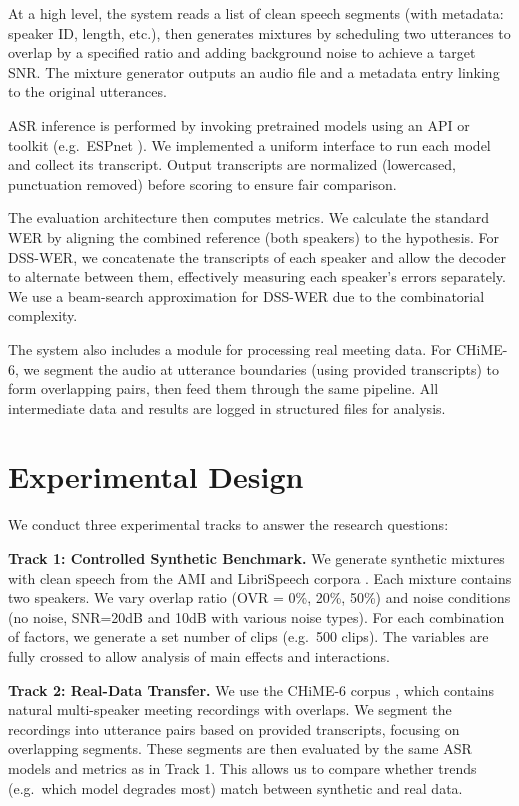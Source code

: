\documentclass[11pt,a4paper]{report}
\begin{document}
At a high level, the system reads a list of clean speech segments (with metadata: speaker ID, length, etc.), then generates mixtures by scheduling two utterances to overlap by a specified ratio and adding background noise to achieve a target SNR. The mixture generator outputs an audio file and a metadata entry linking to the original utterances.

ASR inference is performed by invoking pretrained models using an API or toolkit (e.g.\ ESPnet \cite{ESPnet}). We implemented a uniform interface to run each model and collect its transcript. Output transcripts are normalized (lowercased, punctuation removed) before scoring to ensure fair comparison.

The evaluation architecture then computes metrics. We calculate the standard WER by aligning the combined reference (both speakers) to the hypothesis. For DSS-WER, we concatenate the transcripts of each speaker and allow the decoder to alternate between them, effectively measuring each speaker’s errors separately. We use a beam-search approximation for DSS-WER due to the combinatorial complexity.

The system also includes a module for processing real meeting data. For CHiME-6, we segment the audio at utterance boundaries (using provided transcripts) to form overlapping pairs, then feed them through the same pipeline. All intermediate data and results are logged in structured files for analysis.

\chapter{Experimental Design}
We conduct three experimental tracks to answer the research questions:

\textbf{Track 1: Controlled Synthetic Benchmark.} We generate synthetic mixtures with clean speech from the AMI and LibriSpeech corpora \cite{pratap2020librispeech}. Each mixture contains two speakers. We vary overlap ratio (OVR = 0\%, 20\%, 50\%) and noise conditions (no noise, SNR=20dB and 10dB with various noise types). For each combination of factors, we generate a set number of clips (e.g.\ 500 clips). The variables are fully crossed to allow analysis of main effects and interactions.

\textbf{Track 2: Real-Data Transfer.} We use the CHiME-6 corpus \cite{watanabe2020chime6challengetacklingmultispeakerspeech}, which contains natural multi-speaker meeting recordings with overlaps. We segment the recordings into utterance pairs based on provided transcripts, focusing on overlapping segments. These segments are then evaluated by the same ASR models and metrics as in Track 1. This allows us to compare whether trends (e.g.\ which model degrades most) match between synthetic and real data.
\end{document}
